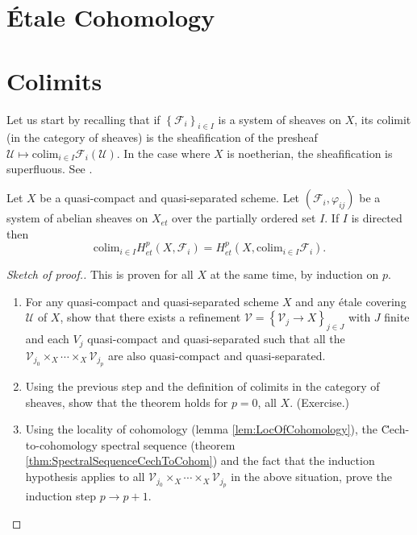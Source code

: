 \section{\'Etale Cohomology}
\label{section-etale-cohomology}


\section{Colimits}
\label{section-colimit}

\noindent
Let us start by recalling that if $\left\{\mathcal{F}_i\right\}_{i\in I}$ is a 
system of sheaves on $X$, its colimit (in the category of sheaves) is the 
sheafification of the presheaf $\mathcal{U} \mapsto \text{colim}_{i\in I} 
\mathcal{F}_i(\mathcal{U})$. In the case where $X$ is noetherian, the 
sheafification is superfluous. See \cite{H}.

\begin{theorem}
Let $X$ be a quasi-compact and quasi-separated scheme. Let 
$\left(\mathcal{F}_i, \varphi_{ij}\right)$ be a system of abelian sheaves on 
$X_{et}$ over the partially ordered set $I$. If $I$ is directed then
$$
\text{colim}_{i\in I} H_{et}^p(X, \mathcal{F}_i) = H_{et}^p(X, 
\text{colim}_{i\in I} \mathcal{F}_i).
$$
\end{theorem}

\begin{proof}[Sketch of proof.] 
This is proven for all $X$ at the same time, by induction on $p$. 
\begin{enumerate}
\item 
For any quasi-compact and quasi-separated scheme $X$ and any \'etale covering 
$\mathcal{U}$ of $X$, show that there exists a refinement $\mathcal{V} 
=\left\{\mathcal{V}_j \to X\right\}_{j\in J}$ with $J$ finite and each $V_j$ 
quasi-compact and quasi-separated such that all the $\mathcal{V}_{j_0} \times_X 
\cdots \times_X \mathcal{V}_{j_p}$ are also quasi-compact and quasi-separated. 
\item 
Using the previous step and the definition of colimits in the category of 
sheaves, show that the theorem holds for $p=0$, all $X$. (Exercise.)
\item 
Using the locality of cohomology (lemma \ref{lem:LocOfCohomology}), the \u 
Cech-to-cohomology spectral sequence (theorem 
\ref{thm:SpectralSequenceCechToCohom}) and the fact that the induction 
hypothesis applies to all $\mathcal{V}_{j_0}\times_X \cdots \times_X 
\mathcal{V}_{j_p}$ in the above situation, prove the induction step $p\to p+1$. 
\end{enumerate}
\end{proof}

